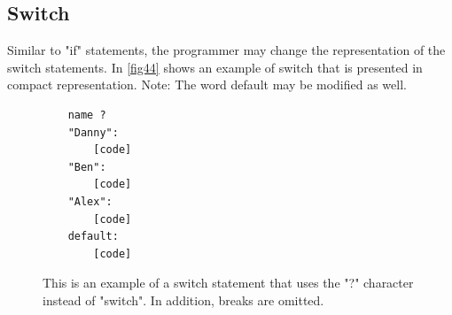 \subsection{Switch}
Similar to "if" statements, the programmer may change the representation of the switch statements. In \autoref{fig44} shows an example of switch that is presented in compact representation. Note: The word default may be modified as well.
\begin{figure}[H]
	\begin{lstlisting}
	name ?
	"Danny": 
		[code]
	"Ben": 
		[code]
	"Alex": 
		[code]
	default: 
		[code]
	\end{lstlisting}
	\caption{This is an example of a switch statement that uses the "?" character instead of "switch". In addition, breaks are omitted.}
	\label{fig44}
\end{figure}
